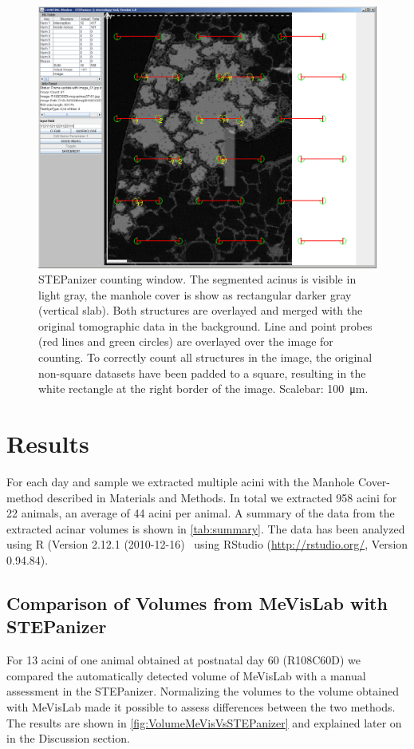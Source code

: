 \documentclass[%
	paper=a4,%
	abstract=true,%
	]{scrartcl}
\newcommand{\imsize}{\linewidth}
\begin{document}
\renewcommand{\imsize}{\linewidth}
\begin{figure}
	\centering
	\includegraphics[width=\imsize]{img/CountingWindowSTEPanizer}
	\caption{STEPanizer counting window. The segmented acinus is visible in light gray, the manhole cover is show as rectangular darker gray (vertical slab). Both structures are overlayed and merged with the original tomographic data in the background. Line and point probes (red lines and green circles) are overlayed over the image for counting. To correctly count all structures in the image, the original non-square datasets have been padded to a square, resulting in the white rectangle at the right border of the image. Scalebar: \SI{100}{\micro\meter}.}
	\label{fig:STEPanizer}
\end{figure}

\section{Results\label{sec:Results}}
For each day and sample we extracted multiple acini with the Manhole Cover-method described in Materials and Methods. In total we extracted 958 acini for 22 animals, an average of 44 acini per animal. A summary of the data from the extracted acinar volumes is shown in \autoref{tab:summary}. The data has been analyzed using R (Version 2.12.1 (2010-12-16)~\cite{R} using RStudio (\url{http://rstudio.org/}, Version 0.94.84).

\subsection{Comparison of Volumes from MeVisLab with STEPanizer}
For 13 acini of one animal obtained at postnatal day 60 (R108C60D) we compared the automatically detected volume of MeVisLab with a manual assessment in the STEPanizer. Normalizing the volumes to the volume obtained with MeVisLab made it possible to assess differences between the two methods. The results are shown in \autoref{fig:VolumeMeVisVsSTEPanizer} and explained later on in the Discussion section.
\end{document}

